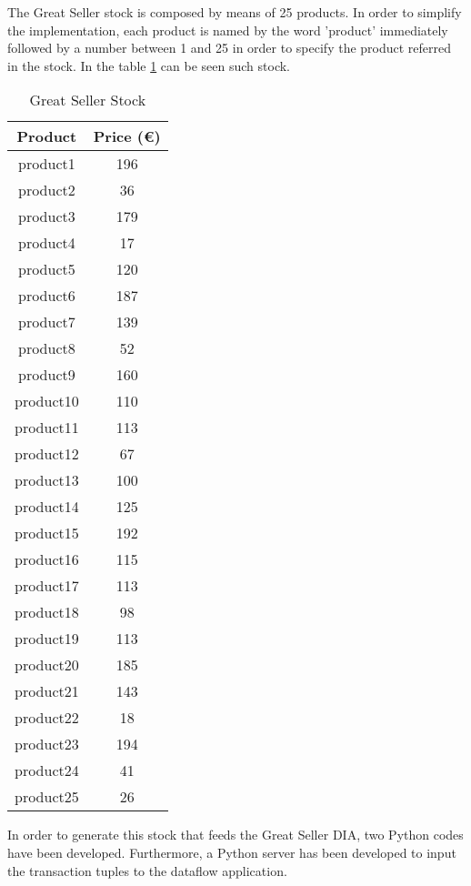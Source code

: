 The Great Seller stock is composed by means of 25 products. In order to simplify the implementation, each product is named by the word 'product' immediately followed by a number between 1 and 25 in order to specify the product referred in the stock. In the table \ref{Great Seller Stock} can be seen such stock.

\begin{table}[h!]
\centering
	\begin{tabular}{||c|c||} 
	\hline\hline
	Product & Price (\euro{}) \\ [1ex] 
	\hline\hline
	product1 & 196 \\ 
	\hline
	product2 & 36 \\ 
	\hline
	product3 & 179 \\ 
	\hline
	product4 & 17 \\ 
	\hline
	product5 & 120 \\ 
	\hline
	product6 & 187 \\ 
	\hline
	product7 & 139 \\ 
	\hline
	product8 & 52 \\ 
	\hline
	product9 & 160 \\ 
	\hline
	product10 & 110 \\ 
	\hline
	product11 & 113 \\ 
	\hline
	product12 & 67 \\ 
	\hline
	product13 & 100 \\ 
	\hline
	product14 & 125 \\ 
	\hline
	product15 & 192 \\ 
	\hline
	product16 & 115 \\ 
	\hline
	product17 & 113 \\ 
	\hline
	product18 & 98 \\ 
	\hline
	product19 & 113 \\ 
	\hline
	product20 & 185 \\ 
	\hline
	product21 & 143 \\ 
	\hline
	product22 & 18 \\ 
	\hline
	product23 & 194 \\ 
	\hline
	product24 & 41 \\ 
	\hline
	product25 & 26 \\ 
	\hline\hline
	\end{tabular}
\caption{Great Seller Stock}
\label{Great Seller Stock}
\end{table}

In order to generate this stock that feeds the Great Seller DIA, two Python codes have been developed. Furthermore, a Python server has been developed to input the transaction tuples to the dataflow application.

